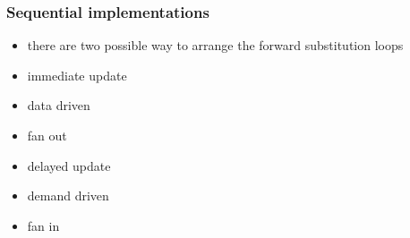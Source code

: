 \begin{frame}[fragile]
%
  \frametitle{Sequential implementations}
%
  \begin{itemize}
  \item there are two possible way to arrange the forward substitution loops 
  \end{itemize}
%
  \begin{minipage}{.45\linewidth}
    \small
    \begin{algorithm}[H]
%
      \dontprintsemicolon
      \nocaptionofalgo
%
%
    \end{algorithm}
%
    \begin{itemize}
    \item immediate update
    \item data driven
    \item fan out
    \end{itemize}
%
  \end{minipage}
%
  \hfill
%
  \begin{minipage}{.45\linewidth}
    \small
    \begin{algorithm}[H]
%
      \dontprintsemicolon
      \nocaptionofalgo
%
%
    \end{algorithm}
%
    \begin{itemize}
    \item delayed update
    \item demand driven
    \item fan in
    \end{itemize}
%
  \end{minipage}
%
\end{frame}

